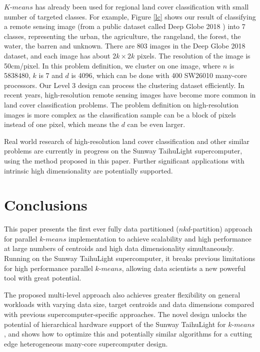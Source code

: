 $K$-$means$ has already been used for regional land cover classification with small number of targeted classes. For example, Figure \ref{lc} shows our result of classifying a remote sensing image (from a public dataset called Deep Globe 2018 \cite{demir2018deepglobe}) into 7 classes, representing the urban, the agriculture, the rangeland, the forest, the water, the barren and unknown. There are 803 images in the Deep Globe 2018 dataset, and each image has about $2k \times 2k$ pixels. The resolution of the image is 50cm/pixel. In this problem definition, we cluster on one image, where $n$ is 5838480, $k$ is 7 and $d$ is 4096, which can be done with 400 SW26010 many-core processors. Our Level 3 design can process the clustering dataset efficiently. 
In recent years, high-resolution remote sensing images have become more common in land cover classification problems. The problem definition on high-resolution images is more complex as the classification sample can be a block of pixels instead of one pixel, which means the $d$ can be even larger.

Real world research of high-resolution land cover classification and other similar problems are currently in progress on the Sunway TaihuLight supercomputer, using the method proposed in this paper. Further significant applications with intrinsic high dimensionality are potentially supported.


\section{Conclusions}
This paper presents the first ever fully data partitioned ($nkd$-partition) approach for parallel $k$-$means$ implementation to achieve scalability and high performance at large numbers of centroids and high data dimensionality simultaneously. Running on the Sunway TaihuLight supercomputer, it breaks previous limitations for high performance parallel $k$-$means$, allowing data scientists a new powerful tool with great potential.

The proposed multi-level approach also achieves greater flexibility on general workloads with varying data size, target centroids and data dimensions compared with previous supercomputer-specific approaches.  The novel design unlocks the potential of hierarchical hardware support of the Sunway TaihuLight for $k$-$means$, and shows how to optimize this and potentially similar algorithms for a cutting edge heterogeneous many-core supercomputer design.

